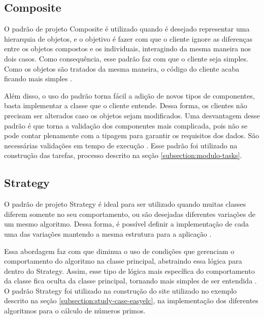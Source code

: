 \documentclass[12pt]{tcc}
\begin{document}
		\subsection{Composite}
		\label{subsection:composite}

		O padrão de projeto Composite é utilizado quando é desejado representar uma hierarquia de objetos, e o objetivo é fazer com que o cliente ignore as diferenças entre os objetos compostos e os individuais, interagindo da mesma maneira nos dois casos. Como consequência, esse padrão faz com que o cliente seja simples. Como os objetos são tratados da mesma maneira, o código do cliente acaba ficando mais simples \citep[Capítulo 4]{gamma1994design}.
		
		Além disso, o uso do padrão torna fácil a adição de novos tipos de componentes, basta implementar a classe que o cliente entende. Dessa forma, os clientes não precisam ser alterados caso os objetos sejam modificados. Uma desvantagem desse padrão é que torna a validação dos componentes mais complicada, pois não se pode contar plenamente com a tipagem para garantir os requisitos dos dados. São necessárias validações em tempo de execução \citep[Capítulo 4]{gamma1994design}. Esse padrão foi utilizado na construção das tarefas, processo descrito na seção \ref{subsection:modulo-tasks}.

		\subsection{Strategy}
		\label{subsection:strategy}

		O padrão de projeto Strategy é ideal para ser utilizado quando muitas classes diferem somente no seu comportamento, ou são desejadas diferentes variações de um mesmo algoritmo. Dessa forma, é possível definir a implementação de cada uma das variações mantendo a mesma estrutura para a aplicação \citep{gamma1994design}. 

		Essa abordagem faz com que diminua o uso de condições que gerenciam o comportamento do algoritmo na classe principal, abstraindo essa lógica para dentro do Strategy. Assim, esse tipo de lógica mais específica do comportamento da classe fica oculta da classe principal, tornando mais simples de ser entendida  \citep{gamma1994design}. O padrão Strategy foi utilizado na construção do site utilizado no exemplo descrito na seção \ref{subsection:study-case-easyelc}, na implementação dos diferentes algoritmos para o cálculo de números primos.
\end{document}
